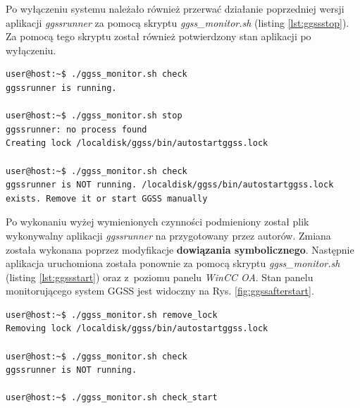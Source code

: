 \newpage
Po wyłączeniu systemu należało również przerwać działanie poprzedniej wersji aplikacji \textit{ggssrunner} za pomocą skryptu \textit{ggss\_monitor.sh} (listing \ref{lst:ggssstop}). Za pomocą tego skryptu został również potwierdzony stan aplikacji po wyłączeniu.


\begin{lstlisting}[language=Cmd, caption={Zatrzymanie działania aplikacji \textit{ggssrunner}}, label={lst:ggssstop}]
user@host:~$ ./ggss_monitor.sh check
ggssrunner is running.

user@host:~$ ./ggss_monitor.sh stop
ggssrunner: no process found
Creating lock /localdisk/ggss/bin/autostartggss.lock

user@host:~$ ./ggss_monitor.sh check
ggssrunner is NOT running. /localdisk/ggss/bin/autostartggss.lock exists. Remove it or start GGSS manually
\end{lstlisting}



Po wykonaniu wyżej wymienionych czynności podmieniony został plik wykonywalny aplikacji \textit{ggssrunner} na przygotowany przez autorów. Zmiana została wykonana poprzez modyfikacje \textbf{dowiązania symbolicznego}. Następnie aplikacja uruchomiona została ponownie za pomocą skryptu \textit{ggss\_monitor.sh} (listing \ref{lst:ggssstart}) oraz z~poziomu panelu \textit{WinCC OA}. Stan panelu monitorującego system GGSS jest widoczny na Rys. \ref{fig:ggssafterstart}.

\begin{lstlisting}[language=Cmd, caption={Ponowne uruchomienie aplikacji \textit{ggssrunner}}, label={lst:ggssstart}]
user@host:~$ ./ggss_monitor.sh remove_lock
Removing lock /localdisk/ggss/bin/autostartggss.lock

user@host:~$ ./ggss_monitor.sh check
ggssrunner is NOT running.

user@host:~$ ./ggss_monitor.sh check_start
\end{lstlisting}

